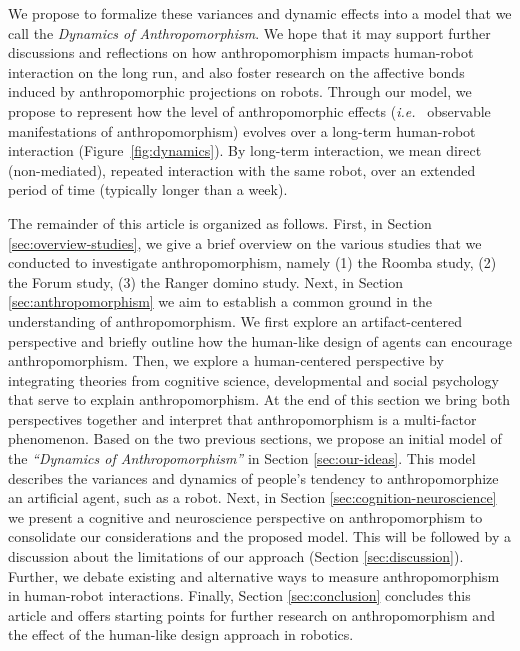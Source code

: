 \documentclass{frontiersSCNS} %
\newcommand{\ie}{{\textit{i.e.~}}}
\begin{document}
We propose to formalize these variances and dynamic effects into a model that we call the
\emph{Dynamics of Anthropomorphism}. We hope that it may support further
discussions and reflections on how anthropomorphism impacts human-robot
interaction on the long run, and also foster research on the affective bonds
induced by anthropomorphic projections on robots.
Through our model, we propose to represent how the level of anthropomorphic effects (\ie
observable manifestations of anthropomorphism) evolves over a long-term
human-robot interaction (Figure~\ref{fig:dynamics}). By long-term interaction,
we mean direct (non-mediated), repeated interaction with the same robot, over
an extended period of time (typically longer than a week).


The remainder of this article is organized as follows.  First, in Section
\ref{sec:overview-studies}, we give a brief overview on the various studies that
we conducted to investigate anthropomorphism, namely (1) the Roomba study, (2)
the Forum study, (3) the Ranger domino study. Next, in Section 
\ref{sec:anthropomorphism} we aim to establish a common ground in the understanding 
of anthropomorphism. We first explore an artifact-centered perspective and briefly
outline how the human-like design of agents can encourage anthropomorphism.
Then, we explore a human-centered perspective by integrating theories from
cognitive science, developmental and social psychology that serve to explain
anthropomorphism. At the end of this section we bring both perspectives together
and interpret that anthropomorphism is a multi-factor phenomenon.  Based on the
two previous sections, we propose an initial model of the \textit{``Dynamics of
Anthropomorphism''} in Section \ref{sec:our-ideas}. This model describes the
variances and dynamics of people's tendency to anthropomorphize an artificial
agent, such as a robot.  Next, in Section \ref{sec:cognition-neuroscience} we
present a cognitive and neuroscience perspective on anthropomorphism to
consolidate our considerations and the proposed model.  This will be followed by
a discussion about the limitations of our approach (Section
\ref{sec:discussion}). Further, we debate existing and alternative ways to
measure anthropomorphism in human-robot interactions.  Finally, Section
\ref{sec:conclusion} concludes this article and offers starting points for
further research on anthropomorphism and the effect of the human-like design
approach in robotics.
\end{document}
